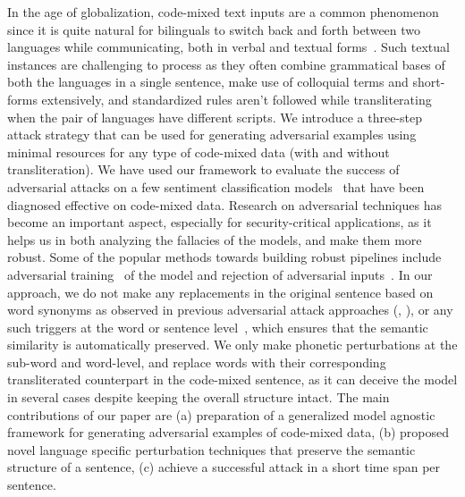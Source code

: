 \documentclass[sigconf]{acmart}
\begin{document}
In the age of globalization, code-mixed text inputs are a common phenomenon since it is quite natural for bilinguals to switch back and forth between two languages while communicating, both in verbal and textual forms~\cite{sridhar1980syntax}. Such textual instances are challenging to process as they often combine grammatical bases of both the languages in a single sentence, make use of colloquial terms and short-forms extensively, and standardized rules aren't followed while transliterating when the pair of languages have different scripts. We introduce a three-step attack strategy that can be used for generating adversarial examples using minimal resources for any type of code-mixed data (with and without transliteration). We have used our framework to evaluate the success of adversarial attacks on a few sentiment classification models~\cite{patwa2020semeval,zhang2015character,pires2019multilingual} that have been diagnosed effective on code-mixed data. Research on adversarial techniques has become an important aspect, especially for security-critical applications, as it helps us in both analyzing the fallacies of the models, and make them more robust. Some of the popular methods towards building robust pipelines include adversarial training~\cite{madry2017towards} of the model and rejection of adversarial inputs~\cite{meng2017magnet}.  
\newline
In our approach, we do not make any replacements in the original sentence based on word synonyms as observed in previous adversarial attack approaches (\citet{jin2020bert}, \citet{li2020bert}), or any such triggers at the word or sentence level~\cite{sun2020natural}, which ensures that the semantic similarity is automatically preserved. We only make phonetic perturbations at the sub-word and word-level, and replace words with their corresponding transliterated counterpart in the code-mixed sentence, as it can deceive the model in several cases despite keeping the overall structure intact. The main contributions of our paper are (a) preparation of a generalized model agnostic framework for generating adversarial examples of code-mixed data, (b) proposed novel language specific perturbation techniques that preserve the semantic structure of a sentence, (c) achieve a successful attack in a short time span per sentence. 
\end{document}
